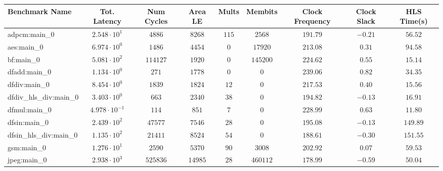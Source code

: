\begin{tabular}{|l|c|c|c|c|c|c|c|c|}
\hline
Benchmark Name          & Tot. Latency            & Num Cycles & Area LE   & Mults   & Membits    & Clock Frequency & Clock Slack & HLS Time(s) \\
\hline
adpcm:main\_0           & $ 2.548 \cdot 10^{1}  $ & $ 4886   $ & $ 8268  $ & $ 115 $ & $ 2568   $ & $ 191.79      $ & $ -0.21   $ & $ 56.52   $ \\
aes:main\_0             & $ 6.974 \cdot 10^{0}  $ & $ 1486   $ & $ 4454  $ & $ 0   $ & $ 17920  $ & $ 213.08      $ & $ 0.31    $ & $ 94.58   $ \\
bf:main\_0              & $ 5.081 \cdot 10^{2}  $ & $ 114127 $ & $ 1920  $ & $ 0   $ & $ 145200 $ & $ 224.62      $ & $ 0.55    $ & $ 15.14   $ \\
dfadd:main\_0           & $ 1.134 \cdot 10^{0}  $ & $ 271    $ & $ 1778  $ & $ 0   $ & $ 0      $ & $ 239.06      $ & $ 0.82    $ & $ 34.35   $ \\
dfdiv:main\_0           & $ 8.454 \cdot 10^{0}  $ & $ 1839   $ & $ 1824  $ & $ 12  $ & $ 0      $ & $ 217.53      $ & $ 0.40    $ & $ 15.56   $ \\
dfdiv\_hls\_div:main\_0 & $ 3.403 \cdot 10^{0}  $ & $ 663    $ & $ 2340  $ & $ 38  $ & $ 0      $ & $ 194.82      $ & $ -0.13   $ & $ 16.91   $ \\
dfmul:main\_0           & $ 4.978 \cdot 10^{-1} $ & $ 114    $ & $ 851   $ & $ 7   $ & $ 0      $ & $ 228.99      $ & $ 0.63    $ & $ 11.80   $ \\
dfsin:main\_0           & $ 2.439 \cdot 10^{2}  $ & $ 47577  $ & $ 7546  $ & $ 28  $ & $ 0      $ & $ 195.08      $ & $ -0.13   $ & $ 149.89  $ \\
dfsin\_hls\_div:main\_0 & $ 1.135 \cdot 10^{2}  $ & $ 21411  $ & $ 8524  $ & $ 54  $ & $ 0      $ & $ 188.61      $ & $ -0.30   $ & $ 151.55  $ \\
gsm:main\_0             & $ 1.276 \cdot 10^{1}  $ & $ 2590   $ & $ 5370  $ & $ 90  $ & $ 3008   $ & $ 202.92      $ & $ 0.07    $ & $ 59.53   $ \\
jpeg:main\_0            & $ 2.938 \cdot 10^{3}  $ & $ 525836 $ & $ 14985 $ & $ 28  $ & $ 460112 $ & $ 178.99      $ & $ -0.59   $ & $ 50.04   $ \\

\end{tabular}
